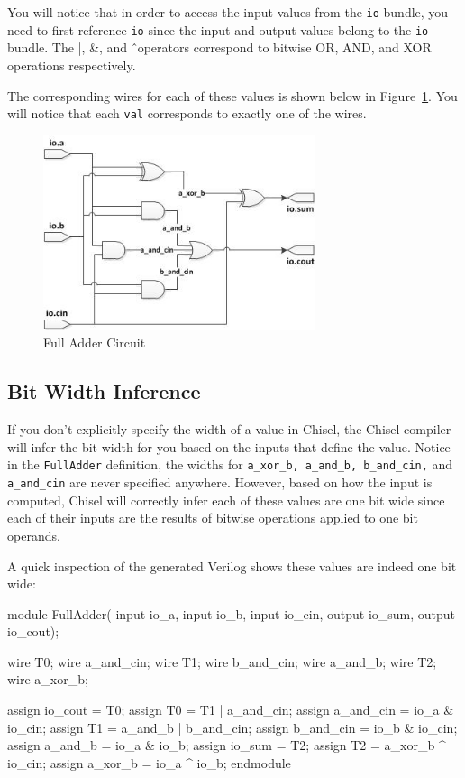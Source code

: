 You will notice that in order to access the input values from the \verb+io+ bundle, you need to first reference \verb+io+ since the input and output values belong to the \verb+io+ bundle. The |, \&, and \^\ operators correspond to bitwise OR, AND, and XOR operations respectively.

The corresponding wires for each of these values is shown below in Figure~\ref{fig:full-adder}.  You will notice that each \verb+val+ corresponds to exactly one of the wires.

\begin{figure}[ht!]
\centering
\includegraphics[width=80mm]{figs/Full_Adder.jpg}
\caption{Full Adder Circuit}
\label{fig:full-adder}
\end{figure}


\subsection{Bit Width Inference}

If you don't explicitly specify the width of a value in Chisel, the Chisel compiler will infer the bit width for you based on the inputs that define the value. Notice in the \verb+FullAdder+ definition, the widths for \verb+a_xor_b, a_and_b, b_and_cin,+ and \verb+a_and_cin+ are never specified anywhere. However, based on how the input is computed, Chisel will correctly infer each of these values are one bit wide since each of their inputs are the results of bitwise operations applied to one bit operands.

A quick inspection of the generated Verilog shows these values are indeed one bit wide:

\begin{bash}
module FullAdder(
    input  io_a,
    input  io_b,
    input  io_cin,
    output io_sum,
    output io_cout);

  wire T0;
  wire a_and_cin;
  wire T1;
  wire b_and_cin;
  wire a_and_b;
  wire T2;
  wire a_xor_b;

  assign io_cout = T0;
  assign T0 = T1 | a_and_cin;
  assign a_and_cin = io_a & io_cin;
  assign T1 = a_and_b | b_and_cin;
  assign b_and_cin = io_b & io_cin;
  assign a_and_b = io_a & io_b;
  assign io_sum = T2;
  assign T2 = a_xor_b ^ io_cin;
  assign a_xor_b = io_a ^ io_b;
endmodule
\end{bash}


